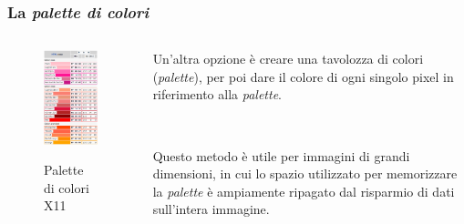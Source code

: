 \documentclass[handout]{beamer}
\begin{document}
\begin{frame}
\frametitle{La \emph{palette di colori}}
\begin{columns}
\begin{column}{.3\textwidth}
  \begin{figure}
    \includegraphics[width=\columnwidth]{img/palette.png}

    \small{Palette di colori X11}
  \end{figure}
\end{column}
\begin{column}{.5\textwidth}
  Un'altra opzione è creare una tavolozza di colori (\emph{palette}), per poi dare il colore di ogni singolo pixel in riferimento alla \emph{palette}.\pause

  ~

  Questo metodo è utile per immagini di grandi dimensioni, in cui lo spazio utilizzato per memorizzare la \emph{palette} è ampiamente ripagato dal risparmio di dati sull'intera immagine.
\end{column}
\end{columns}
\end{frame}
\end{document}
